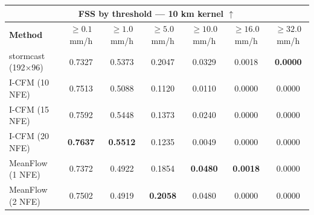 \documentclass[border=10pt]{standalone}
\begin{document}
\begin{tabular}{lcccccc}
\toprule
\multicolumn{7}{c}{\textbf{FSS by threshold — 10 km kernel} $\uparrow$} \\
\midrule
\textbf{Method} & $\geq 0.1$ mm/h & $\geq 1.0$ mm/h & $\geq 5.0$ mm/h & $\geq 10.0$ mm/h & $\geq 16.0$ mm/h & $\geq 32.0$ mm/h \\
\midrule
stormcast (192$\times$96) & 0.7327 & 0.5373 & 0.2047 & 0.0329 & 0.0018 & \textbf{0.0000} \\
I-CFM (10 NFE) & 0.7513 & 0.5088 & 0.1120 & 0.0110 & 0.0000 & 0.0000 \\
I-CFM (15 NFE) & 0.7592 & 0.5448 & 0.1373 & 0.0240 & 0.0000 & 0.0000 \\
I-CFM (20 NFE) & \textbf{0.7637} & \textbf{0.5512} & 0.1235 & 0.0049 & 0.0000 & 0.0000 \\
MeanFlow (1 NFE) & 0.7372 & 0.4922 & 0.1854 & \textbf{0.0480} & \textbf{0.0018} & 0.0000 \\
MeanFlow (2 NFE) & 0.7502 & 0.4919 & \textbf{0.2058} & 0.0480 & 0.0000 & 0.0000 \\
\bottomrule
\end{tabular}
\end{document}
